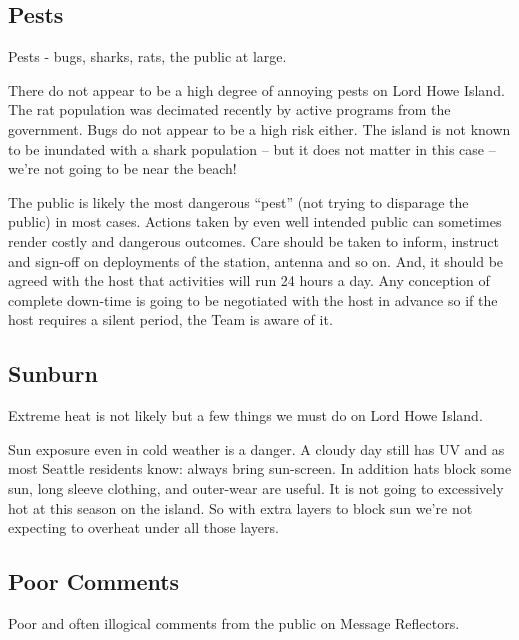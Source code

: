 \documentclass[11pt]{article}
\begin{document}
\subsection{Pests}

Pests - bugs, sharks, rats, the public at large.
\par
 There do not
appear to be a high degree of annoying pests on Lord Howe Island.   The
rat population was decimated recently by active programs from the
government.  Bugs do not appear to be a high risk either.  The island
is not known to be inundated with a shark population -- but it does not
matter in this case -- we're not going  to be near the beach!
\par
The public is likely the most dangerous ``pest'' (not trying to
disparage the public) in most cases.   Actions taken by even well
intended public can sometimes render costly and dangerous outcomes.  Care
should be taken to inform, instruct and sign-off on deployments of the
station, antenna and so on.  And, it should be agreed with the host
that activities will run 24 hours a day.  Any conception of complete
down-time is going to be negotiated with the host in advance so
if the host requires a silent period, the Team is aware of it.  

\subsection{Sunburn}

Extreme heat is not likely but a few things we must do on Lord Howe Island.
\par
Sun exposure even in cold weather is a danger.  A cloudy day still has UV
and as most Seattle residents know:  always bring sun-screen.  In addition
hats block some sun, long sleeve clothing, and outer-wear are useful.  It is
not going to excessively hot at this season on the island.   So with
extra layers to block sun we're not expecting to overheat under all those
layers.

\subsection{Poor Comments}

Poor and often illogical comments from the public on Message Reflectors.
\par
\end{document}
